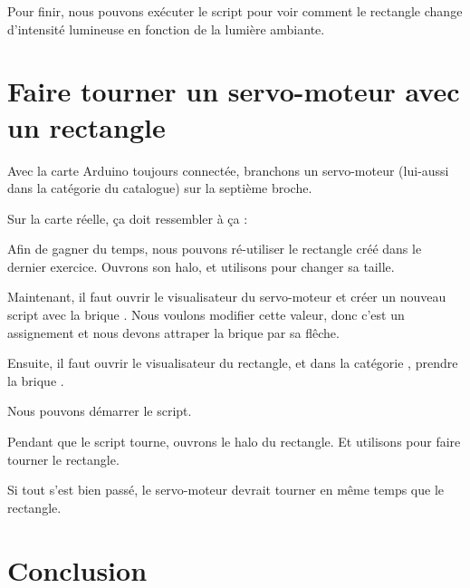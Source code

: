 \documentclass[french]{etoys-guide}
\begin{document}

Pour finir, nous pouvons exécuter le script pour voir comment le rectangle
change d'intensité lumineuse en fonction de la lumière ambiante.

\section{Faire tourner un servo-moteur avec un rectangle}

Avec la carte Arduino toujours connectée, branchons un servo-moteur (lui-aussi
dans la catégorie  du catalogue) sur la septième broche.


Sur la carte réelle, ça doit ressembler à ça :


Afin de gagner du temps, nous pouvons ré-utiliser le rectangle créé dans le
dernier exercice. Ouvrons son halo, et utilisons 
pour changer sa taille.


Maintenant, il faut ouvrir le visualisateur du servo-moteur et créer un nouveau
script avec la brique . Nous voulons modifier cette
valeur, donc c'est un assignement et nous devons attraper la
brique par sa  flêche.


Ensuite, il faut ouvrir le visualisateur du rectangle, et dans la catégorie
, prendre la brique .

Nous pouvons démarrer le script.


Pendant que le script tourne, ouvrons le halo du rectangle. Et utilisons  pour faire tourner le rectangle.


Si tout s'est bien passé, le servo-moteur devrait tourner en même temps que le
rectangle.

\section{Conclusion}
\end{document}
